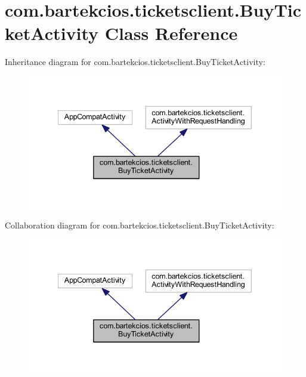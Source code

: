 \hypertarget{classcom_1_1bartekcios_1_1ticketsclient_1_1_buy_ticket_activity}{}\section{com.\+bartekcios.\+ticketsclient.\+Buy\+Ticket\+Activity Class Reference}
\label{classcom_1_1bartekcios_1_1ticketsclient_1_1_buy_ticket_activity}


Inheritance diagram for com.\+bartekcios.\+ticketsclient.\+Buy\+Ticket\+Activity\+:
\nopagebreak
\begin{figure}[H]
\begin{center}
\leavevmode
\includegraphics[width=340pt]{classcom_1_1bartekcios_1_1ticketsclient_1_1_buy_ticket_activity__inherit__graph}
\end{center}
\end{figure}


Collaboration diagram for com.\+bartekcios.\+ticketsclient.\+Buy\+Ticket\+Activity\+:
\nopagebreak
\begin{figure}[H]
\begin{center}
\leavevmode
\includegraphics[width=340pt]{classcom_1_1bartekcios_1_1ticketsclient_1_1_buy_ticket_activity__coll__graph}
\end{center}
\end{figure}
